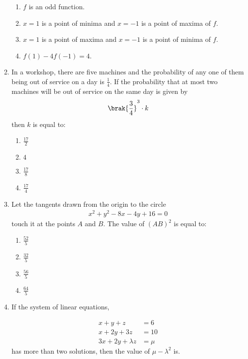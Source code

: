\documentclass{article}
\begin{document}
\begin{enumerate}
\begin{enumerate}   
   \item $f$ is an odd function.
   \item $x = 1$ is a point of minima and $x = -1$ is a point of maxima of $f$.
   \item $x = 1$ is a point of maxima and $x = -1$ is a point of minima of $f$.
   \item $f(1) - 4f(-1) = 4$.
\end{enumerate}

\item In a workshop, there are five machines and the probability of any one of them being out of service on a day is $\frac{1}{4}$. If the probability that at most two machines will be out of service on the same day is given by \begin{align*}\brak {\frac{3}{4}} ^3 \cdot k \end{align*}then $k$ is equal to:

\begin{enumerate}    
   \item $\frac{17}{2}$
   \item $4$
   \item $\frac{17}{8}$
   \item $\frac{17}{4}$
\end{enumerate}

\item Let the tangents drawn from the origin to the circle \begin{align*}x^2 + y^2 - 8x - 4y + 16 = 0\end{align*}touch it at the points $A$ and $B$. The value of $(AB)^2$ is equal to:

\begin{enumerate}
   \item $\frac{52}{5}$
   \item $\frac{32}{5}$
   \item $\frac{56}{5}$
   \item $\frac{64}{5}$
\end{enumerate}

\item If the system of linear equations,

\begin{align*}
    x + y + z &= 6 \\
    x + 2y + 3z &= 10 \\
    3x + 2y + \lambda z &= \mu
\end{align*}has more than two solutions, then the value of $\mu -\lambda^2$ is\underline{\hspace{1cm}}.


\end{enumerate}
\end{document}
